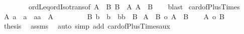 \begin{isabellebody}
\ \ \ \ \ \ \ \ ordLeq{\isacharunderscore}{\kern0pt}ordIso{\isacharunderscore}{\kern0pt}trans{\isacharbrackleft}{\kern0pt}of\ {\isachardoublequoteopen}{\isacharbar}{\kern0pt}A\ {\isacharless}{\kern0pt}{\isacharplus}{\kern0pt}{\isachargreater}{\kern0pt}\ B{\isacharbar}{\kern0pt}{\isachardoublequoteclose}\ {\isachardoublequoteopen}{\isacharbar}{\kern0pt}B\ {\isasymtimes}\ A{\isacharbar}{\kern0pt}{\isachardoublequoteclose}\ {\isachardoublequoteopen}{\isacharbar}{\kern0pt}A\ {\isasymtimes}\ B{\isacharbar}{\kern0pt}{\isachardoublequoteclose}{\isacharbrackright}{\kern0pt}\isanewline
\ \ \isamarkupfalse%
\ blast\isanewline
{}\isamarkupfalse%
%
\endisatagproof
{\isafoldproof}%
%
\isadelimproof
\isanewline
%
\endisadelimproof
\isanewline
{}\isamarkupfalse%
\ card{\isacharunderscore}{\kern0pt}of{\isacharunderscore}{\kern0pt}Plus{\isacharunderscore}{\kern0pt}Times{\isacharcolon}{\kern0pt}\isanewline
{}\ A{}{\isacharcolon}{\kern0pt}\ {\isachardoublequoteopen}a{}\ {\isasymnoteq}\ a{}\ {\isasymand}\ {\isacharbraceleft}{\kern0pt}a{}{\isacharcomma}{\kern0pt}a{}{\isacharbraceright}{\kern0pt}\ {\isasymle}\ A{\isachardoublequoteclose}\ \isanewline
\ \ \ \ \ \ \ \ B{}{\isacharcolon}{\kern0pt}\ {\isachardoublequoteopen}b{}\ {\isasymnoteq}\ b{}\ {\isasymand}\ {\isacharbraceleft}{\kern0pt}b{}{\isacharcomma}{\kern0pt}b{}{\isacharbraceright}{\kern0pt}\ {\isasymle}\ B{\isachardoublequoteclose}\isanewline
{}\ {\isachardoublequoteopen}{\isacharbar}{\kern0pt}A\ {\isacharless}{\kern0pt}{\isacharplus}{\kern0pt}{\isachargreater}{\kern0pt}\ B{\isacharbar}{\kern0pt}\ {\isasymle}o\ {\isacharbar}{\kern0pt}A\ {\isasymtimes}\ B{\isacharbar}{\kern0pt}{\isachardoublequoteclose}\isanewline
%
\isadelimproof
%
\endisadelimproof
%
\isatagproof
{}\isamarkupfalse%
{\isacharminus}{\kern0pt}\isanewline
\ \ \isacommand{{\isacharbraceleft}{\kern0pt}}\isamarkupfalse%
\isamarkupfalse%
\ {\isachardoublequoteopen}{\isacharbar}{\kern0pt}A{\isacharbar}{\kern0pt}\ {\isasymle}o\ {\isacharbar}{\kern0pt}B{\isacharbar}{\kern0pt}{\isachardoublequoteclose}\isanewline
\ \ \ \isamarkupfalse%
\ {\isacharquery}{\kern0pt}thesis\ \isamarkupfalse%
\ assms\ \isamarkupfalse%
\ {\isacharparenleft}{\kern0pt}auto\ simp\ add{\isacharcolon}{\kern0pt}\ card{\isacharunderscore}{\kern0pt}of{\isacharunderscore}{\kern0pt}Plus{\isacharunderscore}{\kern0pt}Times{\isacharunderscore}{\kern0pt}aux{\isacharparenright}{\kern0pt}\isanewline

\end{isabellebody}
